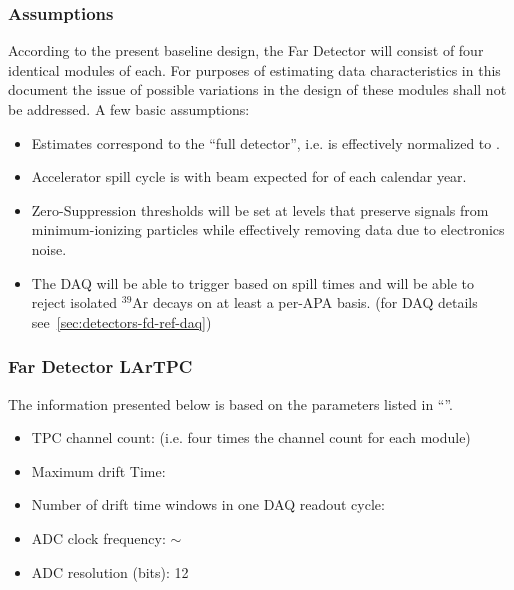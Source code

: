 
\subsubsection{Assumptions}
\label{sec:detectors-sc-infrastructure-assumptions}
According to the present baseline design, the Far Detector will
consist of four identical modules of \tpcmodulemass each.  For
purposes of estimating data characteristics in this document the issue
of possible variations in the design of these modules shall not be
addressed. A few basic assumptions:
\begin{itemize}
\item Estimates correspond to the ``full detector'',
  i.e. is effectively normalized to \dunedetectormass.
\item Accelerator spill cycle is \beamspillcycle with beam expected
  for \beamrunfraction of each calendar year.
\item Zero-Suppression thresholds will be set at levels that preserve
  signals from minimum-ionizing particles while effectively removing
  data due to electronics noise.
\item The DAQ will be able to trigger based on spill times and will be
  able to reject isolated $^{39}$Ar decays on at least a per-APA
  basis. (for DAQ details see~\ref{sec:detectors-fd-ref-daq})
\end{itemize}

\subsubsection{Far Detector LArTPC}
The information presented below is based on the parameters listed in
``\anxrates''.
\begin{itemize}
\item TPC channel count: \dunenumberchannels (i.e. four times the
  \daqchannelspermodule channel count for each \tpcmodulemass module)
\item Maximum drift Time: \tpcdrifttime
\item Number of drift time windows in one DAQ readout cycle: \daqdriftsperreadout
\item ADC clock frequency: $\sim$\daqsamplerate
\item ADC resolution (bits): 12
\end{itemize}

